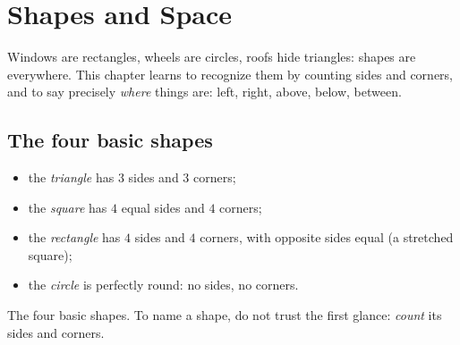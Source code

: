 \chapter{Shapes and Space}\label{ch:g1:shapes}

Windows are rectangles, wheels are circles, roofs hide triangles:
shapes are everywhere. This chapter learns to recognize them by
counting sides and corners, and to say precisely \emph{where} things
are: left, right, above, below, between.

\section{The four basic shapes}

\begin{definition}\label{def:g1:shapes:def}
\begin{itemize}
  \item the \emph{triangle} has $3$ sides and $3$ corners;
  \item the \emph{square} has $4$ equal sides and $4$ corners;
  \item the \emph{rectangle} has $4$ sides and $4$ corners, with
        opposite sides equal (a stretched square);
  \item the \emph{circle} is perfectly round: no sides, no corners.
\end{itemize}
\end{definition}

\begin{omfigure}

{\small The four basic shapes. To name a shape, do not trust the
first glance: \emph{count} its sides and corners.}
\end{omfigure}

